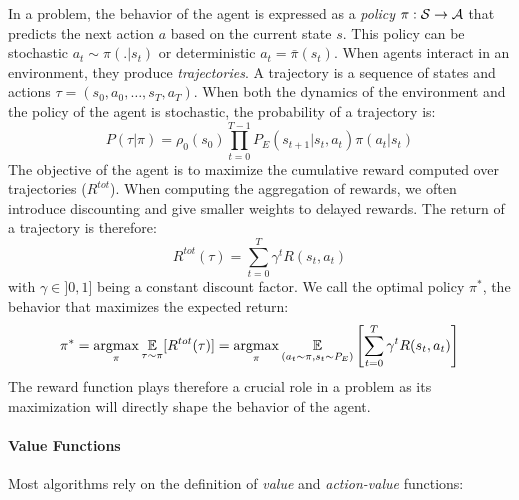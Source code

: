 In a \rl problem, the behavior of the agent is expressed as a \textit{policy} $\pi : \mathcal{S} \rightarrow \mathcal{A}$ that predicts the next action $a$ based on the current state $s$. This policy can be stochastic ${a_t\sim\pi(.|s_t)}$ or deterministic $a_t=\bar{\pi}(s_t)$. When agents interact in an environment, they produce \textit{trajectories}. A trajectory is a sequence of states and actions $\tau=(s_0,a_0,\dots,s_T,a_T)$. When both the dynamics of the environment and the policy of the agent is stochastic, the probability of a trajectory is:
\begin{equation}
P(\tau|\pi)=\rho_0(s_0)\prod_{t=0}^{T-1} P_E(s_{t+1}|s_t,a_t)\pi(a_t|s_t)	
\label{eq:traj_dist}
\end{equation}
The objective of the agent is to maximize the cumulative reward computed over trajectories ($R^{tot}$). When computing the aggregation of rewards,  we often introduce discounting and give smaller weights to delayed rewards. The return of a trajectory is therefore:
\begin{equation}
R^{tot}(\tau) = \sum_{t=0}^{T} \gamma^{t}R(s_t,a_t)
\end{equation}
with $\gamma \in ]0,1]$ being a constant discount factor. We call the optimal policy $\pi^*$, the behavior that maximizes the expected return:
\begin{equation}
	\pi^*=\operatorname*{argmax}_\pi \underset{\tau\sim\pi}{\mathbb{E}}[R^{tot}(\tau)] = \operatorname*{argmax}_\pi \underset{(a_t\sim\pi, s_t\sim P_E)}{\mathbb{E}}\left[\sum_{t=0}^{T} \gamma^{t}R(s_t,a_t)\right]
\end{equation}
The reward function plays therefore a crucial role in a \rl problem as its maximization will directly shape the behavior of the agent.

\paragraph{Value Functions}

Most \rl algorithms rely on the definition of \textit{value} and \textit{action-value} functions:

